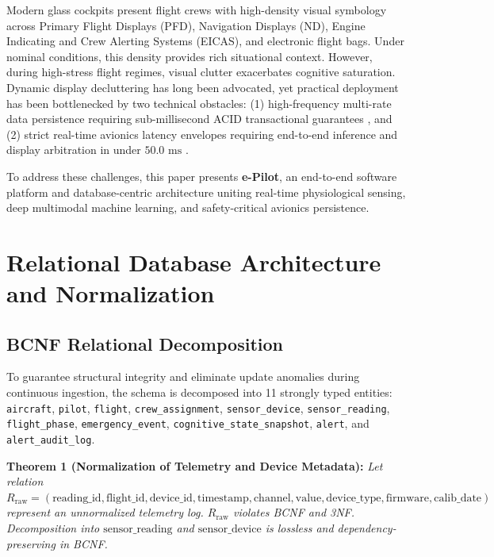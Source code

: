 \documentclass[journal]{IEEEtran}
\begin{document}
Modern glass cockpits present flight crews with high-density visual symbology across Primary Flight Displays (PFD), Navigation Displays (ND), Engine Indicating and Crew Alerting Systems (EICAS), and electronic flight bags. Under nominal conditions, this density provides rich situational context. However, during high-stress flight regimes, visual clutter exacerbates cognitive saturation. Dynamic display decluttering has long been advocated, yet practical deployment has been bottlenecked by two technical obstacles: (1) high-frequency multi-rate data persistence requiring sub-millisecond ACID transactional guarantees \cite{elmasri2016fundamentals, silberschatz2019database}, and (2) strict real-time avionics latency envelopes requiring end-to-end inference and display arbitration in under $50.0\text{ ms}$ \cite{do178c, do254}.

To address these challenges, this paper presents \textbf{e-Pilot}, an end-to-end software platform and database-centric architecture uniting real-time physiological sensing, deep multimodal machine learning, and safety-critical avionics persistence.

\section{Relational Database Architecture and Normalization}

\subsection{BCNF Relational Decomposition}
To guarantee structural integrity and eliminate update anomalies during continuous ingestion, the schema is decomposed into 11 strongly typed entities: \texttt{aircraft}, \texttt{pilot}, \texttt{flight}, \texttt{crew\_assignment}, \texttt{sensor\_device}, \texttt{sensor\_reading}, \texttt{flight\_phase}, \texttt{emergency\_event}, \texttt{cognitive\_state\_snapshot}, \texttt{alert}, and \texttt{alert\_audit\_log}.

\textbf{Theorem 1 (Normalization of Telemetry and Device Metadata):}
\textit{Let relation $R_{\text{raw}} = (\text{reading\_id}, \text{flight\_id}, \text{device\_id}, \text{timestamp}, \text{channel}, \text{value}, \text{device\_type}, \text{firmware}, \text{calib\_date})$ represent an unnormalized telemetry log. $R_{\text{raw}}$ violates BCNF and 3NF. Decomposition into $\text{sensor\_reading}$ and $\text{sensor\_device}$ is lossless and dependency-preserving in BCNF.}
\end{document}

